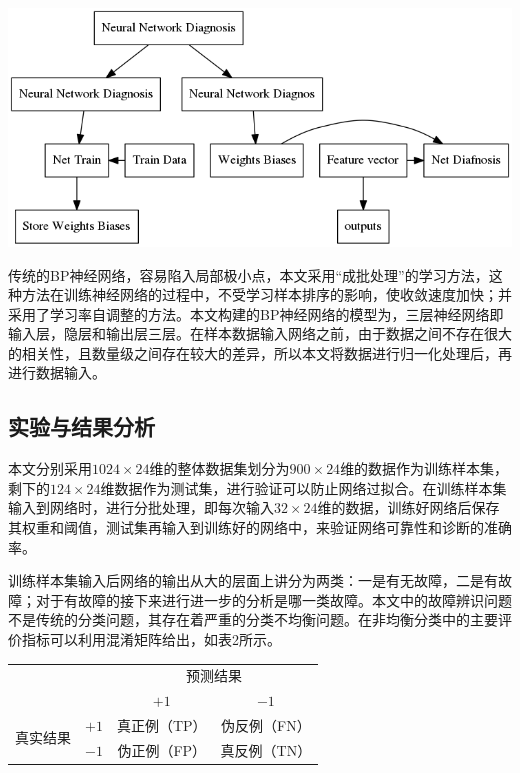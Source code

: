\documentclass{ctacn}%
\begin{document}
\begin{multicols}{2}
\begin{center}
	\includegraphics[scale=0.12, trim=0 0 0 0]{figs/procedure}
	\label{fig2}
\end{center}

传统的BP神经网络，容易陷入局部极小点，本文采用“成批处理”的学习方法，这种方法在训练神经网络的过程中，不受学习样本排序的影响，使收敛速度加快；并采用了学习率自调整的方法。本文构建的BP神经网络的模型为，三层神经网络即输入层，隐层和输出层三层。在样本数据输入网络之前，由于数据之间不存在很大的相关性，且数量级之间存在较大的差异，所以本文将数据进行归一化处理后，再进行数据输入。

\subsection{实验与结果分析}

本文分别采用$1024\times24$维的整体数据集划分为$900\times24$维的数据作为训练样本集，剩下的$124\times24$维数据作为测试集，进行验证可以防止网络过拟合。在训练样本集输入到网络时，进行分批处理，即每次输入$32\times24$维的数据，训练好网络后保存其权重和阈值，测试集再输入到训练好的网络中，来验证网络可靠性和诊断的准确率。

训练样本集输入后网络的输出从大的层面上讲分为两类：一是有无故障，二是有故障；对于有故障的接下来进行进一步的分析是哪一类故障。本文中的故障辨识问题不是传统的分类问题，其存在着严重的分类不均衡问题。在非均衡分类中的主要评价指标可以利用混淆矩阵给出，如表2所示。


\begin{center}
	\label{tab:2}
	\begin{tabular} {cccc}\toprule
		\multirow{2}{*}[-2pt]{}&\multirow{2}{*}[-2pt]{}&\multicolumn{2}{c}{预测结果}\\
		\cmidrule(lr){3-4}
		&&$+1$&$-1$\\\hline
		\multirow{2}{*}[-2pt]{真实结果}&$+1$&真正例（TP）&伪反例（FN）\\
		&$-1$&伪正例（FP）&真反例（TN）\\
		\bottomrule
\end{tabular}\end{center}


\end{multicols}
\end{document}

